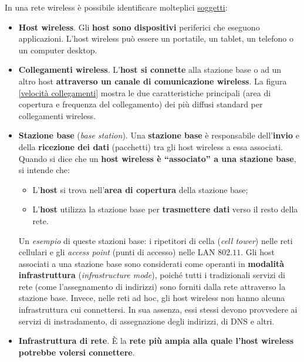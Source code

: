 \documentclass[a4paper]{article}
\begin{document}
	In una rete wireless è possibile identificare molteplici \underline{soggetti}:
	\begin{itemize}
		\item \textcolor{Red3}{\textbf{Host wireless}}. Gli \textbf{host sono dispositivi} periferici che eseguono applicazioni. L’host wireless può essere un portatile, un tablet, un telefono o un computer desktop.
		
		\item \textcolor{Red3}{\textbf{Collegamenti wireless}}. L’\textbf{host si connette} alla stazione base o ad un altro host \textbf{attraverso un canale di comunicazione wireless}. La figura \ref{velocità collegamenti} mostra le due caratteristiche principali (area di copertura e frequenza del collegamento) dei più diffusi standard per collegamenti wireless.
		
		\item \textcolor{Red3}{\textbf{Stazione base} (\emph{base station})}. Una \textbf{stazione base} è responsabile dell’\textbf{invio} e della \textbf{ricezione dei dati} (pacchetti) tra gli host wireless a essa associati. Quando si dice che un \textbf{host wireless è “associato” a una stazione base}, si intende che:
		\begin{itemize}
			\item L’\textbf{host} si trova nell’\textbf{area di copertura} della stazione base;
			\item L’\textbf{host} utilizza la stazione base per \textbf{trasmettere dati} verso il resto della rete.
		\end{itemize}
		Un \emph{esempio} di queste stazioni base: i ripetitori di cella (\emph{cell tower}) nelle reti cellulari e gli \emph{access point} (punti di accesso) nelle LAN $802.11$.\newline
		Gli host associati a una stazione base sono considerati come operanti in \textbf{modalità infrastruttura} (\emph{infrastructure mode}), poiché tutti i tradizionali servizi di rete (come l’assegnamento di indirizzi) sono forniti dalla rete attraverso la stazione base.\newline
		Invece, nelle reti ad hoc, gli host wireless non hanno alcuna infrastruttura cui connettersi. In sua assenza, essi stessi devono provvedere ai servizi di instradamento, di assegnazione degli indirizzi, di DNS e altri.
		
		
		\item \textcolor{Red3}{\textbf{Infrastruttura di rete}}. È la \textbf{rete più ampia alla quale l’host wireless potrebbe volersi connettere}.
	\end{itemize}
\end{document}
